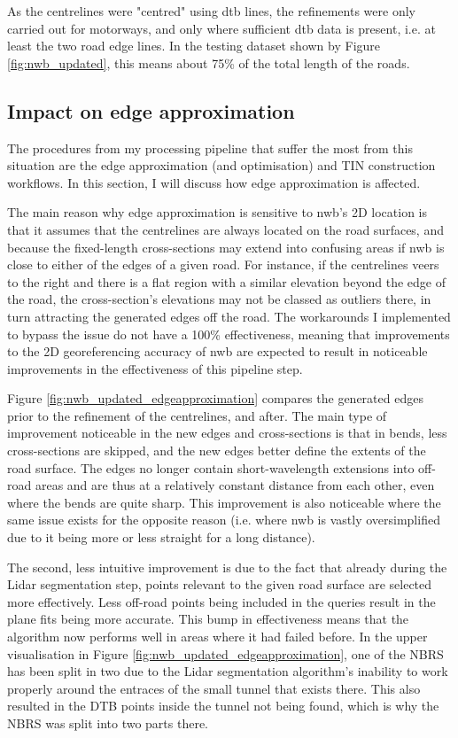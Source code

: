 As the centrelines were "centred" using \ac{dtb} lines, the refinements were only carried out for motorways, and only where sufficient \ac{dtb} data is present, i.e. at least the two road edge lines. In the testing dataset shown by Figure \ref{fig:nwb_updated}, this means about 75\% of the total length of the roads.

\subsection{Impact on edge approximation}
\label{sub:nwb_updated_edgeapproximation}

The procedures from my processing pipeline that suffer the most from this situation are the edge approximation (and optimisation) and TIN construction workflows. In this section, I will discuss how edge approximation is affected.

The main reason why edge approximation is sensitive to \ac{nwb}'s 2D location is that it assumes that the centrelines are always located on the road surfaces, and because the fixed-length cross-sections may extend into confusing areas if \ac{nwb} is close to either of the edges of a given road. For instance, if the centrelines veers to the right and there is a flat region with a similar elevation beyond the edge of the road, the cross-section's elevations may not be classed as outliers there, in turn attracting the generated edges off the road. The workarounds I implemented to bypass the issue do not have a 100\% effectiveness, meaning that improvements to the 2D georeferencing accuracy of \ac{nwb} are expected to result in noticeable improvements in the effectiveness of this pipeline step.

Figure \ref{fig:nwb_updated_edgeapproximation} compares the generated edges prior to the refinement of the centrelines, and after. The main type of improvement noticeable in the new edges and cross-sections is that in bends, less cross-sections are skipped, and the new edges better define the extents of the road surface. The edges no longer contain short-wavelength extensions into off-road areas and are thus at a relatively constant distance from each other, even where the bends are quite sharp. This improvement is also noticeable where the same issue exists for the opposite reason (i.e. where \ac{nwb} is vastly oversimplified due to it being more or less straight for a long distance).

The second, less intuitive improvement is due to the fact that already during the Lidar segmentation step, points relevant to the given road surface are selected more effectively. Less off-road points being included in the queries result in the plane fits being more accurate. This bump in effectiveness means that the algorithm now performs well in areas where it had failed before. In the upper visualisation in Figure \ref{fig:nwb_updated_edgeapproximation}, one of the NBRS has been split in two due to the Lidar segmentation algorithm's inability to work properly around the entraces of the small tunnel that exists there. This also resulted in the DTB points inside the tunnel not being found, which is why the NBRS was split into two parts there.

